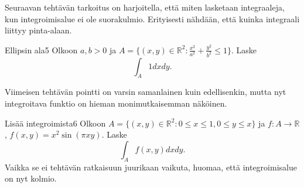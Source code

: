 \documentclass[11pt,a4paper]{amsart}
\newcommand{\R}{\mathbb{R}}
\newcommand{\1}{\mathbf{1}}
\begin{document}
Seuraavan tehtävän tarkoitus on harjoitella, että miten lasketaan integraaleja, kun integroimisalue ei ole suorakulmio. Erityisesti nähdään, että kuinka integraali liittyy pinta-alaan.

\begin{Exercises}{Ellipsin ala}{5}
Olkoon $a,b>0$ ja $A=\{(x,y)\in \R^2: \frac{x^2}{a^2}+\frac{y^2}{b^2}\leq 1\}$. Laske 
\[
\int_A 1 dxdy.
\]

\end{Exercises}

Viimeisen tehtävän pointti on varsin samanlainen kuin edellisenkin, mutta nyt integroitava funktio on hieman monimutkaisemman näköinen.

\begin{Exercises}{Lisää integroimista}{6}
Olkoon $A=\{(x,y)\in \R^2: 0\leq x\leq 1, 0\leq y\leq x\}$ ja $f:A\to \R$, $f(x,y)=x^2\sin (\pi x y)$. Laske 
\[
\int_A f(x,y)dxdy.
\]
Vaikka se ei tehtävän ratkaisuun juurikaan vaikuta, huomaa, että integroimisalue on nyt kolmio.

\end{Exercises}
\end{document}
